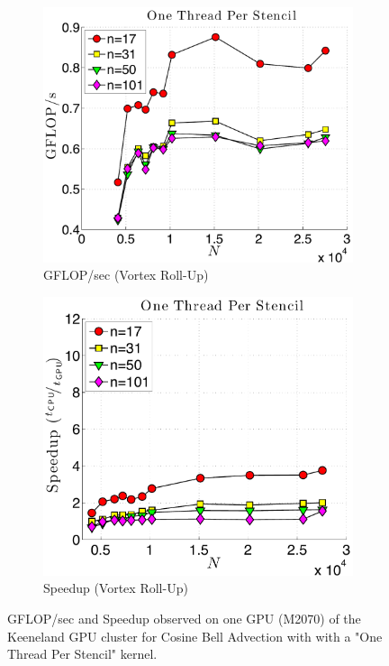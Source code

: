 \begin{figure}
\begin{subfigure}[t]{0.46\textwidth}
\includegraphics[width=\textwidth]{../figures/keeneland_results/alltoallv_vortex/gflops_gpu_1proc_oneThreadPerStencil.pdf}
\caption{GFLOP/sec (Vortex Roll-Up)}
\label{fig:gflops_gpu_1proc_oneThread_keeneland_vortex}
\end{subfigure}
\quad
\begin{subfigure}[t]{0.425\textwidth}
\includegraphics[width=\textwidth]{../figures/keeneland_results/alltoallv_vortex/speedup_1proc_oneThreadPerStencil.pdf}
\caption{Speedup (Vortex Roll-Up)}
\label{fig:speedup_1proc_oneThread_keeneland}
\end{subfigure} 
\caption{GFLOP/sec and Speedup observed on one GPU (M2070) of the Keeneland GPU cluster for Cosine Bell Advection with with a "One Thread Per Stencil" kernel.}
\end{figure} 




